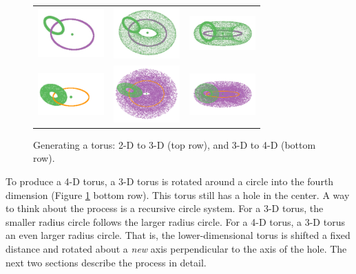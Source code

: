 \begin{figure}[ht]
\centering
\begin{tabular}{c c c}
\includegraphics[width=1in]{fig/torus-ring-3-2nd-1.pdf} & \includegraphics[width=1in]{fig/torus-ring-3-2nd-2.pdf} & \includegraphics[width=1in]{fig/torus-ring-3-2nd-3.pdf}   \\ \includegraphics[width=1in]{fig/torus-rings-4-2.pdf} &\includegraphics[width=1in]{fig/torus-rings-4-with-torus-2.pdf}&\includegraphics[width=1in]{fig/torus-rings-4-with-torus-1.pdf}
\end{tabular}
\caption{Generating a torus: 2-D to 3-D (top row), and 3-D to 4-D (bottom row).}
\label{ringtorus}
\end{figure}

To produce a 4-D torus, a 3-D torus is rotated around a circle into
the fourth dimension (Figure \ref{ringtorus} bottom row).  This torus
still has a hole in the center.  A way to think about the process is a
recursive circle system. For a 3-D torus, the smaller radius circle
follows the larger radius circle. For a 4-D torus, a 3-D torus an even
larger radius circle.  That is, the lower-dimensional torus is
shifted a fixed distance and rotated about a \textit{new} axis
perpendicular to the axis of the hole. The next two sections describe
the process in detail.

